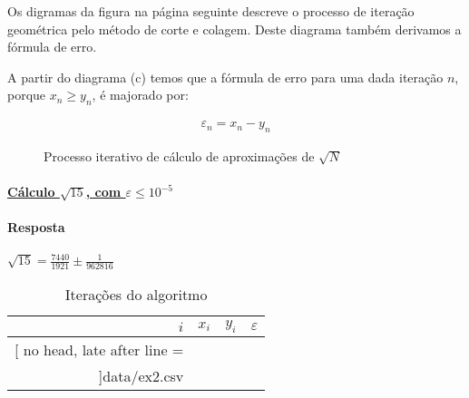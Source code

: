 Os digramas da figura na página seguinte descreve o processo de iteração geométrica pelo método de corte e
colagem. Deste diagrama também derivamos a fórmula de erro.

A partir do diagrama (c) temos que a fórmula de erro para uma dada iteração $n$, porque
$x_n \geq y_n$,  é majorado por:

\begin{align*}
	\varepsilon_n = x_n - y_n
\end{align*}


\clearpage
\begin{figure}[ht!]
	\centering
	\begin{subfigure}[b]{0.3\textwidth}
	\centering
	
	\caption{}
	\end{subfigure}
	\begin{subfigure}[b]{0.30\textwidth}
	\centering
	
	\caption{}
	\end{subfigure}
	\begin{subfigure}[b]{0.30\textwidth}
	\centering
	
	\caption{}
	\end{subfigure}

	\bigskip

	\begin{subfigure}{0.4\textwidth}
	\centering
	
	\caption{}
	\end{subfigure}
	\begin{subfigure}{0.4\textwidth}
	\centering
	
	\caption{}
	\end{subfigure}
	\caption{Processo iterativo de cálculo de aproximações de $\sqrt{N}$}%
\end{figure}


\paragraph{\underline{Cálculo $\sqrt{15}$, com $\varepsilon \leq 10^{-5}$}}
\hfill

\paragraph{Resposta} $\sqrt{15} = \frac{7440}{1921} \pm \frac{1}{962816}$

\begin{table}[h]
	\centering
	\label{tab:raiz-15-iteracoes}
	\begin{tabular}{|r|l|l|l|}
		\hline
		$i$ & $x_i$ & $y_i$ & $\varepsilon$\\
		\hline
		\csvreader[
			no head,
			late after line = \\\hline
		]{data/ex2.csv} {}{
			\csvcoli & \csvcolii &\csvcoliii &\csvcoliv
		}
	\end{tabular}
	\caption{Iterações do algoritmo}
\end{table}

